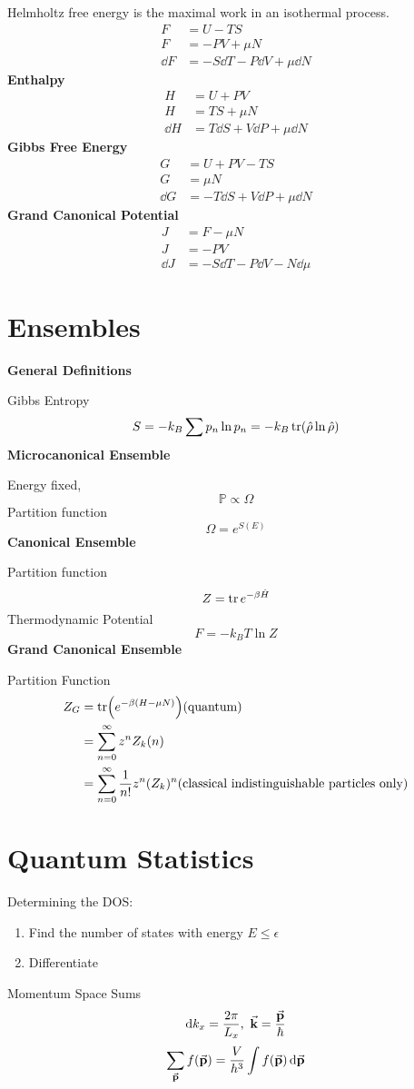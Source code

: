 \documentclass[prb,12pt]{revtex4-2}
\theoremstyle{definition}
\theoremstyle{definition}
\theoremstyle{definition}
\begin{document}
Helmholtz free energy is the maximal work in an isothermal process.
\begin{align*}
	F&= U - TS\\
	F &= -PV + \mu N\\
	\dd{F}&= -S\dd{T} -P\dd{V} + \mu \dd{N}
\end{align*}
\textbf{Enthalpy}
\begin{align*}
	H &= U + PV\\
	H &= TS + \mu N\\
	\dd{H} &= T\dd{S} + V\dd{P} + \mu \dd{N}
\end{align*}
\textbf{Gibbs Free Energy}
\begin{align*}
	G&= U + PV - TS\\
	G&=\mu N\\
	\dd{G}&= - T\dd{S} + V\dd{P} + \mu \dd{N}
\end{align*}
\textbf{Grand Canonical Potential}
\begin{align*}
	J &=F - \mu N\\
	J &= - PV\\
	\dd{J} &= -S\dd{T} - P \dd{V} - N \dd{\mu}
\end{align*}
\section{Ensembles}
\textbf{General Definitions}

Gibbs Entropy
\[S = -k_B \sum p_n \ln p_n=-k_B \tr(\hat{\rho}\ln \hat{\rho})\]
\textbf{Microcanonical Ensemble}

Energy fixed, 
\[\mathbb{P} \propto \Omega\]
Partition function
\[\Omega = e^{S(E)}\]
\textbf{Canonical Ensemble}

Partition function
\[Z = \tr e^{-\beta \hat{H}}\]
Thermodynamic Potential
\[F = -k_B T \ln Z\]
\textbf{Grand Canonical Ensemble}

Partition Function
\begin{align*}
Z_G &= \tr(e^{-\beta(H-\mu N)})\text{(quantum)}\\
&= \sum_{n=0}^\infty z^n Z_k(n)\\
&= \sum_{n=0}^\infty \frac 1{n!} z^n (Z_k)^n \text{(classical indistinguishable particles only)}  
\end{align*}
\section{Quantum Statistics}
Determining the DOS:
\begin{enumerate}
	\item Find the number of states with energy $E\le \epsilon$
	\item Differentiate
\end{enumerate}
Momentum Space Sums
\[\dd{k_x} =\frac{2\pi}{L_x},~\va k = \frac{\va p}{\hbar}\]
\[\sum_{\va p} f(\va p) = \frac{V}{h^3}\int f(\va p)\dd{\va p}\]
\end{document}
